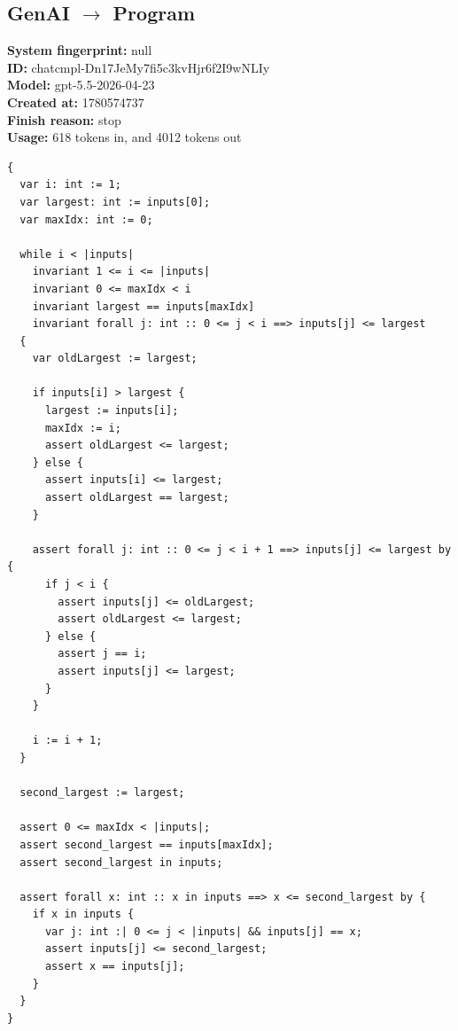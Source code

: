 \documentclass{article}
\begin{document}
\subsection*{GenAI $\rightarrow$ Program}
\textbf{System fingerprint: }null
\\\textbf{ID: }chatcmpl-Dn17JeMy7fi5c3kvHjr6f2I9wNLIy
\\\textbf{Model: }gpt-5.5-2026-04-23
\\\textbf{Created at: }1780574737
\\\textbf{Finish reason: }stop
\\\textbf{Usage: }618 tokens in, and 4012 tokens out
\begin{lstlisting}
{
  var i: int := 1;
  var largest: int := inputs[0];
  var maxIdx: int := 0;

  while i < |inputs|
    invariant 1 <= i <= |inputs|
    invariant 0 <= maxIdx < i
    invariant largest == inputs[maxIdx]
    invariant forall j: int :: 0 <= j < i ==> inputs[j] <= largest
  {
    var oldLargest := largest;

    if inputs[i] > largest {
      largest := inputs[i];
      maxIdx := i;
      assert oldLargest <= largest;
    } else {
      assert inputs[i] <= largest;
      assert oldLargest == largest;
    }

    assert forall j: int :: 0 <= j < i + 1 ==> inputs[j] <= largest by {
      if j < i {
        assert inputs[j] <= oldLargest;
        assert oldLargest <= largest;
      } else {
        assert j == i;
        assert inputs[j] <= largest;
      }
    }

    i := i + 1;
  }

  second_largest := largest;

  assert 0 <= maxIdx < |inputs|;
  assert second_largest == inputs[maxIdx];
  assert second_largest in inputs;

  assert forall x: int :: x in inputs ==> x <= second_largest by {
    if x in inputs {
      var j: int :| 0 <= j < |inputs| && inputs[j] == x;
      assert inputs[j] <= second_largest;
      assert x == inputs[j];
    }
  }
}
\end{lstlisting}
\end{document}
